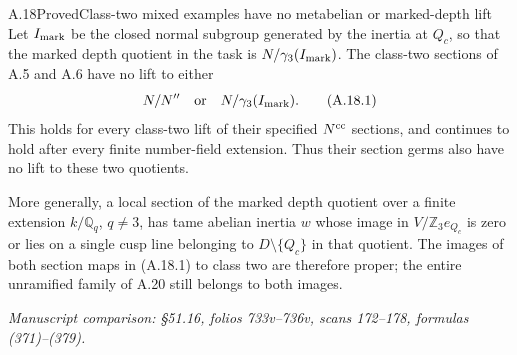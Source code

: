 \begin{statement}{A.18}{Proved}{Class-two mixed examples have no metabelian or marked-depth lift}
Let $I_{\rm mark}$ be the closed normal subgroup generated
by the inertia at $Q_c$, so that the marked depth quotient
in the task is $N/\gamma_3(I_{\rm mark})$.
The class-two sections of A.5 and A.6 have no lift to either
\[
 N/N''\quad\text{or}\quad N/\gamma_3(I_{\rm mark}).
 \tag{A.18.1}
\]
This holds for every class-two lift of their specified
$N^{\rm cc}$ sections, and continues to hold after every
finite number-field extension. Thus their section germs
also have no lift to these two quotients.

More generally, a local section of the marked depth quotient
over a finite extension $k/\mathbb Q_q$, $q\ne3$, has
tame abelian inertia $w$ whose image in
$V/\mathbb Z_3e_{Q_c}$ is zero or lies on a single cusp
line belonging to $D\setminus\{Q_c\}$ in that quotient.
The images of both section maps in (A.18.1) to class two
are therefore proper; the entire unramified family of
A.20 still belongs to both images.
\par\smallskip\noindent\emph{Manuscript comparison: \S51.16,
folios 733v--736v, scans 172--178, formulas (371)--(379).}
\end{statement}
